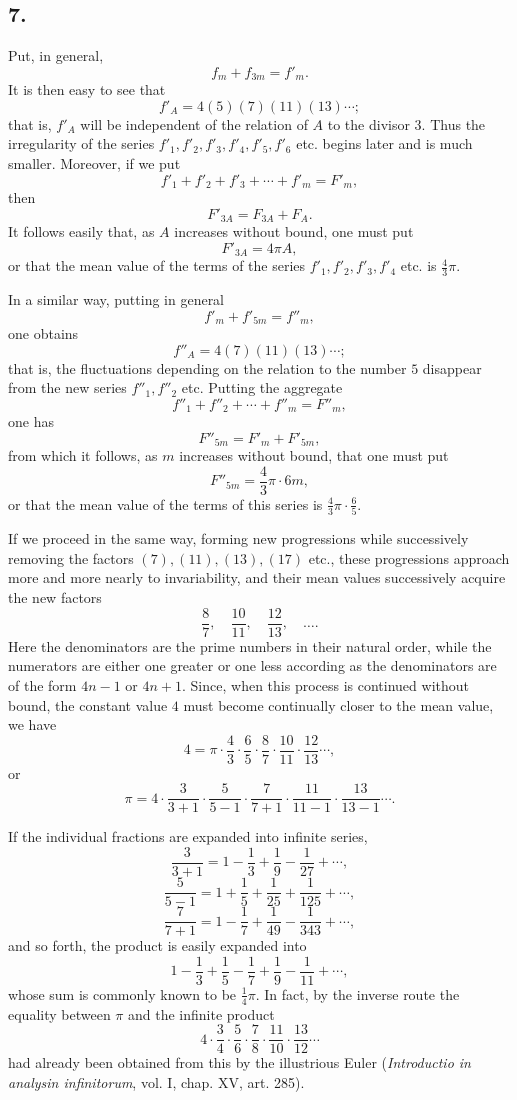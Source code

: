 \documentclass[12pt]{article}
\begin{document}
\subsection*{7.}

Put, in general,
\[
f_m+f_{3m}=f'_m.
\]
It is then easy to see that
\[
f'_A=4(5)(7)(11)(13)\cdots;
\]
that is, $f'_A$ will be independent of the relation of $A$ to the divisor $3$. Thus the irregularity of the series $f'_1,f'_2,f'_3,f'_4,f'_5,f'_6$ etc. begins later and is much smaller. Moreover, if we put
\[
f'_1+f'_2+f'_3+\cdots+f'_m=F'_m,
\]
then
\[
F'_{3A}=F_{3A}+F_A.
\]
It follows easily that, as $A$ increases without bound, one must put
\[
F'_{3A}=4\pi A,
\]
or that the mean value of the terms of the series $f'_1,f'_2,f'_3,f'_4$ etc. is $\frac43\pi$.

In a similar way, putting in general
\[
f'_m+f'_{5m}=f''_m,
\]
one obtains
\[
f''_A=4(7)(11)(13)\cdots;
\]
that is, the fluctuations depending on the relation to the number $5$ disappear from the new series $f''_1,f''_2$ etc. Putting the aggregate
\[
f''_1+f''_2+\cdots+f''_m=F''_m,
\]
one has
\[
F''_{5m}=F'_m+F'_{5m},
\]
from which it follows, as $m$ increases without bound, that one must put
\[
F''_{5m}=\frac43\pi\cdot 6m,
\]
or that the mean value of the terms of this series is $\frac43\pi\cdot\frac65$.

If we proceed in the same way, forming new progressions while successively removing the factors $(7),(11),(13),(17)$ etc., these progressions approach more and more nearly to invariability, and their mean values successively acquire the new factors
\[
\frac87,\quad \frac{10}{11},\quad \frac{12}{13},\quad \ldots.
\]
Here the denominators are the prime numbers in their natural order, while the numerators are either one greater or one less according as the denominators are of the form $4n-1$ or $4n+1$. Since, when this process is continued without bound, the constant value $4$ must become continually closer to the mean value, we have
\[
4=\pi\cdot \frac43\cdot\frac65\cdot\frac87\cdot\frac{10}{11}\cdot\frac{12}{13}\cdots,
\]
or
\[
\pi=4\cdot\frac{3}{3+1}\cdot\frac{5}{5-1}\cdot\frac{7}{7+1}\cdot\frac{11}{11-1}\cdot\frac{13}{13-1}\cdots.
\]

If the individual fractions are expanded into infinite series,
\[
\frac{3}{3+1}=1-\frac13+\frac1{9}-\frac1{27}+\cdots,
\]
\[
\frac{5}{5-1}=1+\frac15+\frac1{25}+\frac1{125}+\cdots,
\]
\[
\frac{7}{7+1}=1-\frac17+\frac1{49}-\frac1{343}+\cdots,
\]
and so forth, the product is easily expanded into
\[
1-\frac13+\frac15-\frac17+\frac19-\frac1{11}+\cdots,
\]
whose sum is commonly known to be $\frac14\pi$. In fact, by the inverse route the equality between $\pi$ and the infinite product
\[
4\cdot\frac34\cdot\frac56\cdot\frac78\cdot\frac{11}{10}\cdot\frac{13}{12}\cdots
\]
had already been obtained from this by the illustrious Euler (\emph{Introductio in analysin infinitorum}, vol. I, chap. XV, art. 285).
\end{document}
